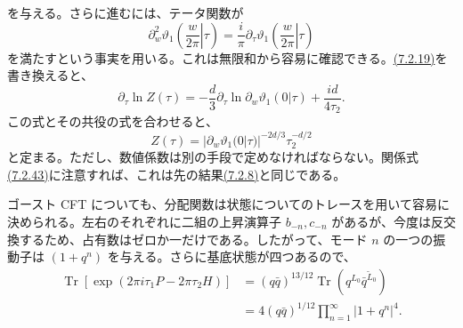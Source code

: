 を与える。さらに進むには、テータ関数が
\begin{equation}
\partial_w^2\vartheta_1\left(\left.\frac w{2\pi}\right|\tau\right)
=\frac i\pi\partial_\tau
\vartheta_1\left(\left.\frac w{2\pi}\right|\tau\right)
\tag{7.2.20}\label{eq:7.2.20}
\end{equation}
を満たすという事実を用いる。これは無限和から容易に確認できる。\hyperref[eq:7.2.19]{(7.2.19)}を書き換えると、
\begin{equation}
\partial_\tau\ln Z(\tau)
=-\frac d3\partial_\tau\ln\partial_w\vartheta_1(0|\tau)
+\frac{id}{4\tau_2}.
\tag{7.2.21}\label{eq:7.2.21}
\end{equation}
この式とその共役の式を合わせると、
\begin{equation}
Z(\tau)=|\partial_w\vartheta_1(0|\tau)|^{-2d/3}\tau_2^{-d/2}
\tag{7.2.22}\label{eq:7.2.22}
\end{equation}
と定まる。ただし、数値係数は別の手段で定めなければならない。関係式\hyperref[eq:7.2.43]{(7.2.43)}に注意すれば、これは先の結果\hyperref[eq:7.2.8]{(7.2.8)}と同じである。


ゴースト CFT についても、分配関数は状態についてのトレースを用いて容易に決められる。左右のそれぞれに二組の上昇演算子 $b_{-n},c_{-n}$ があるが、今度は反交換するため、占有数はゼロか一だけである。したがって、モード $n$ の一つの振動子は $(1+q^n)$ を与える。さらに基底状態が四つあるので、
\begin{equation}
\begin{aligned}
\operatorname{Tr}[\exp(2\pi i\tau_1P-2\pi\tau_2H)]
&=(q\bar q)^{13/12}\operatorname{Tr}(q^{L_0}\bar q^{\tilde L_0})\\
&=4(q\bar q)^{1/12}\prod_{n=1}^{\infty}|1+q^n|^4.
\end{aligned}
\tag{7.2.23}\label{eq:7.2.23}
\end{equation}

